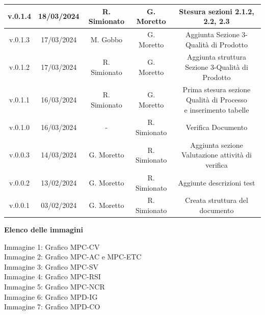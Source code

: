 \documentclass[5pt]{article}
\begin{document}
\begin{table}[H]
{\begin{tabular}{|c|c|c|c|c|}
				\hline
				v.0.1.4 & 18/03/2024 & R. Simionato & G. Moretto & Stesura sezioni 2.1.2, 2.2, 2.3 \\
				\hline
				v.0.1.3 & 17/03/2024 & M. Gobbo & G. Moretto & Aggiunta Sezione 3-Qualità di Prodotto \\
				\hline
				v.0.1.2 & 17/03/2024 & R. Simionato & G. Moretto & Aggiunta struttura Sezione 3-Qualità di Prodotto \\
				\hline
				v.0.1.1 & 16/03/2024 & R. Simionato & G. Moretto & \shortstack{Prima stesura sezione Qualità di Processo\\e inserimento tabelle} \\
				\hline
				v.0.1.0 & 16/03/2024 & - & R. Simionato & Verifica Documento \\
				\hline
				v.0.0.3 & 14/03/2024 & G. Moretto & R. Simionato & Aggiunta sezione Valutazione attività di verifica \\
				\hline
				v.0.0.2 & 13/02/2024 & G. Moretto & R. Simionato  &  Aggiunte descrizioni test\\
				\hline
				v.0.0.1 & 03/02/2024 & G. Moretto & R. Simionato  & Creata struttura del documento \\
				\hline
	   		\end{tabular}
		}
	 	\label{tab:conference}
    \end{table}

	\pagebreak
	\tableofcontents
	\pagebreak
	
	\begin{flushleft}
		\textbf{\Large Elenco delle immagini} 
		
		\begin{spacing}{1.5} 
			
			Immagine 1: Grafico MPC-CV \\
			Immagine 2: Grafico MPC-AC e MPC-ETC \\
			Immagine 3: Grafico MPC-SV \\
			Immagine 4: Grafico MPC-RSI \\
			Immagine 5: Grafico MPC-NCR \\
			Immagine 6: Grafico MPD-IG \\
			Immagine 7: Grafico MPD-CO
		\end{spacing}
	\end{flushleft}
	\pagebreak
	
\end{document}
